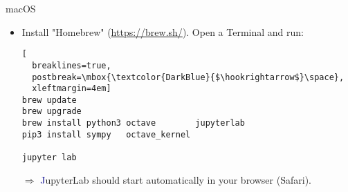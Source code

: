 \begin{frame}[fragile]{macOS}
\begin{itemize}
\itemsep2em
\item
Install "Homebrew" (\url{https://brew.sh/}).
Open a Terminal and run:
\begin{lstlisting}[
  breaklines=true,
  postbreak=\mbox{\textcolor{DarkBlue}{$\hookrightarrow$}\space},
  xleftmargin=4em]
brew update
brew upgrade
brew install python3 octave        jupyterlab
pip3 install sympy   octave_kernel

jupyter lab
\end{lstlisting}
$\Rightarrow$ {\textcolor{DarkBlue}JupyterLab} should start automatically
in your browser (Safari).
\end{itemize}
\vfill
\end{frame}
